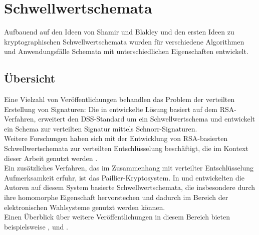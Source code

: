 \section{Schwellwertschemata}

\label{sec_state_threshold}





Aufbauend auf den Ideen von Shamir und Blakley und den ersten Ideen zu kryptographischen Schwellwertschemata wurden für verschiedene Algorithmen und Anwendungsfälle Schemata mit unterschiedlichen Eigenschaften entwickelt.

\subsection{Übersicht}

Eine Vielzahl von Veröffentlichungen behandlen das Problem der verteilten Erstellung von Signaturen: Die in \cite{shoup2000practical} entwickelte Lösung basiert auf dem RSA-Verfahren, \cite{gennaro1996robustdss} erweitert den DSS-Standard um ein Schwellwertschema und \cite{stinson2001provably} entwickelt ein Schema zur verteilten Signatur mittels Schnorr-Signaturen.\\
Weitere Forschungen haben sich mit der Entwicklung von RSA-basierten Schwellwertschemata zur verteilten Entschlüsselung beschäftigt, die im Kontext dieser Arbeit genutzt werden \cite{frankel1997proactive, gennaro1996robust, rabin1998simplified}. \\
Ein zusätzliches Verfahren, das im Zusammenhang mit verteilter Entschlüsselung Aufmerksamkeit erfuhr, ist das Paillier-Kryptosystem. In \cite{damgard2001} und \cite{fouque2000sharing} entwickelten die Autoren auf diesem System basierte Schwellwertschemata, die insbesondere durch ihre homomorphe Eigenschaft hervorstechen und dadurch im Bereich der elektronischen Wahlsysteme genutzt werden können.\\
Einen Überblick über weitere Veröffentlichungen in diesem Bereich bieten beispielsweise \cite{desmedt1997some}, \cite{gemmell1997} und \cite{desmedt1993}.

